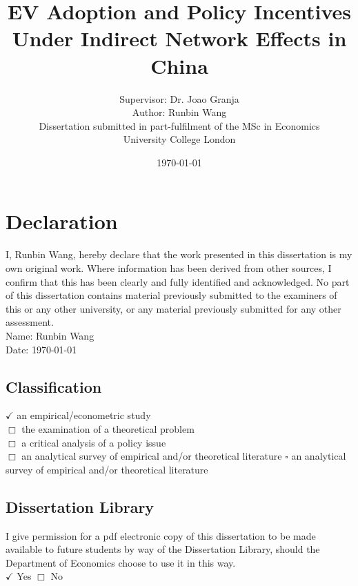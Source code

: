 \documentclass[12pt]{article}
\title{EV Adoption and Policy Incentives Under Indirect Network Effects in China}
\author{
Supervisor: Dr. Joao Granja \\
\vspace{2cm}
Author: Runbin Wang \\
Dissertation submitted in part-fulfilment of the MSc in Economics \\
University College London
}
\date{\today}
\begin{document}
\onehalfspacing
\maketitle

\newpage
\section*{Declaration}
I, Runbin Wang, hereby declare that the work presented in this dissertation is my own original work. Where information has been derived from other sources, 
I confirm that this has been clearly and fully identified and acknowledged.  No part of this dissertation contains material previously submitted to the examiners of this or any other university, 
or any material previously submitted for any other assessment.\\

Name: Runbin Wang \\

Date: \today

\subsection*{Classification}
$\checkmark$	an empirical/econometric study\\
$\Box$	the examination of a theoretical problem\\
$\Box$	a critical analysis of a policy issue\\
$\Box$	an analytical survey of empirical and/or theoretical literature
$\square$	an analytical survey of empirical and/or theoretical literature

\subsection*{Dissertation Library}

I give permission for a pdf electronic copy of this dissertation to be made available to future students by way of the Dissertation Library, 
should the Department of Economics choose to use it in this way. \vspace{0.2cm} \\

$\checkmark$ Yes
$\Box$ No




\newpage
\tableofcontents


\newpage
\end{document}
